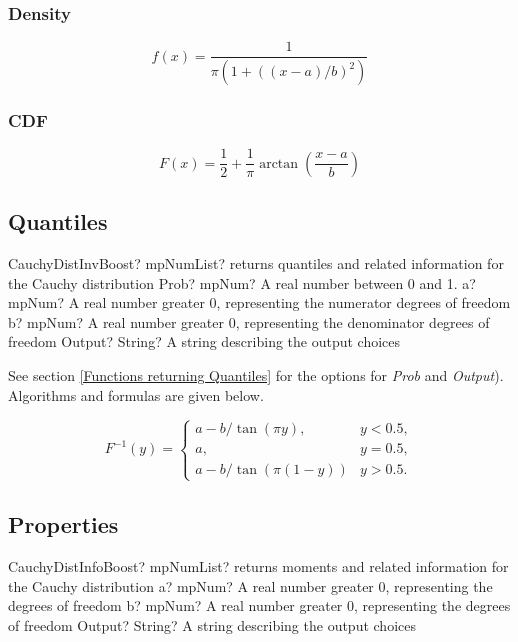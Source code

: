 \subsubsection{Density}
\label{CauchyDistributionDensity}

\begin{equation} 
	f(x)=\frac{1}{\pi(1+((x-a)/b)^2)}
\end{equation}


\subsubsection{CDF}
\begin{equation} 
	F(x)=\frac{1}{2} + \frac{1}{\pi} \arctan \left(\frac{x-a}{b} \right)
\end{equation}



\subsection{Quantiles}
\begin{mpFunctionsExtract}
	\mpFunctionFour
	{CauchyDistInvBoost? mpNumList? returns quantiles and related information for the Cauchy distribution}
	{Prob? mpNum? A real number between 0 and 1.}
	{a? mpNum? A real number greater 0, representing the numerator  degrees of freedom}
	{b? mpNum? A real number greater 0, representing the denominator degrees of freedom}
	{Output? String? A string describing the output choices}
\end{mpFunctionsExtract}

See section \ref{Functions returning Quantiles} for the options for  {\itshape\sffamily Prob} and {\itshape\sffamily Output}). Algorithms and formulas are given below.

\begin{equation}
	F^{-1}(y)=\begin{cases}
		a-b/\tan(\pi y), & y<0.5,\\
		a, &  y=0.5,\\
		a-b/\tan(\pi (1-y)) & y>0.5.
	\end{cases}
\end{equation}




\subsection{Properties}
\label{CauchyDistributionProperties}


\begin{mpFunctionsExtract}
	\mpFunctionThree
	{CauchyDistInfoBoost? mpNumList? returns moments and related information for the Cauchy distribution}
	{a? mpNum? A real number greater 0, representing the degrees of freedom}
	{b? mpNum? A real number greater 0, representing the degrees of freedom}
	{Output? String? A string describing the output choices}
\end{mpFunctionsExtract}

